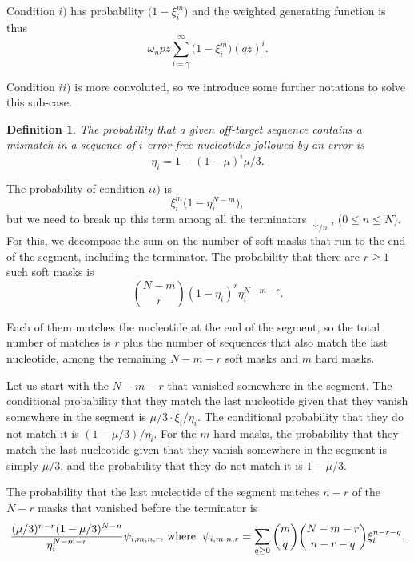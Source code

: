 \documentclass{article}
\newtheorem{definition}{Definition}
\begin{document}
Condition $i)$ has probability $\big(1 - \xi_i^m \big)$ and the
weighted generating function is thus
\begin{equation*}
\omega_n pz \sum_{i=\gamma}^\infty \Big(1 - \xi_i^m \Big) (qz)^i.
\end{equation*}

Condition $ii)$ is more convoluted, so we introduce some further
notations to solve this sub-case.
\begin{definition}
The probability that a given off-target sequence contains a mismatch in a
sequence of $i$ error-free nucleotides followed by an error is
\begin{equation}
\label{eq:eta}
\eta_i = 1-(1-\mu)^i\mu/3.
\end{equation}
\end{definition}

The probability of condition $ii)$ is
\begin{equation*}
\xi_i^m \Big(1 - \eta_i^{N-m} \Big),
\end{equation*}
but we need to break up this term among all the terminators
$\downarrow_{/n}$, ($0 \leq n \leq N$). For this, we decompose the sum on
the number of soft masks that run to the end of the segment, including the
terminator. The probability that there are $r \geq 1$ such soft masks is
\begin{equation*}
{N-m \choose r} (1 - \eta_i)^r \eta_i^{N-m-r}.
\end{equation*}

Each of them matches the nucleotide at the end of the segment, so the
total number of matches is $r$ plus the number of sequences that also
match the last nucleotide, among the remaining $N-m-r$ soft masks and $m$
hard masks.

Let us start with the $N-m-r$ that vanished somewhere in the segment. The
conditional probability that they match the last nucleotide given that
they vanish somewhere in the segment is $\mu/3 \cdot \xi_i / \eta_i$. The
conditional probability that they do not match it is $(1-\mu/3) / \eta_i$.
For the $m$ hard masks, the probability that they match the last
nucleotide given that they vanish somewhere in the segment is simply
$\mu/3$, and the probability that they do not match it is $1-\mu/3$.

The probability that the last nucleotide of the segment matches $n-r$ of
the $N-r$ masks that vanished before the terminator is
\begin{equation*}
\frac{(\mu/3)^{n-r}(1-\mu/3)^{N-n}}{\eta_i^{N-m-r}}
\psi_{i,m,n,r}\text{, where \;}
\psi_{i,m,n,r} = \sum_{q \geq 0}{m \choose q}{N-m-r \choose n-r-q}
\xi_i^{n-r-q}.
\end{equation*}
\end{document}
